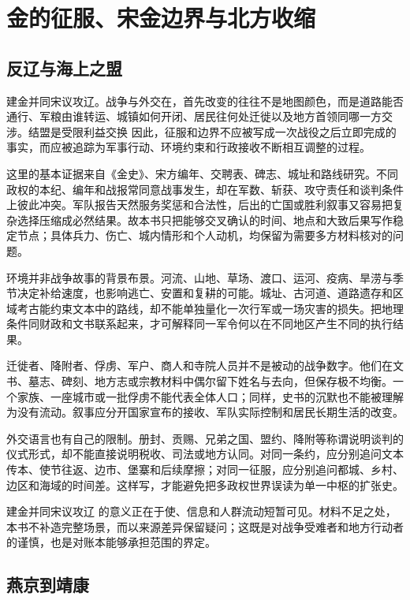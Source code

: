 \section{金的征服、宋金边界与北方收缩}

\subsection{反辽与海上之盟}

建金并同宋议攻辽。战争与外交在，首先改变的往往不是地图颜色，而是道路能否通行、军粮由谁转运、城镇如何开闭、居民往何处迁徙以及地方首领同哪一方交涉。结盟是受限利益交换 因此，征服和边界不应被写成一次战役之后立即完成的事实，而应被追踪为军事行动、环境约束和行政接收不断相互调整的过程。

这里的基本证据来自《金史》、宋方编年、交聘表、碑志、城址和路线研究。不同政权的本纪、编年和战报常同意战事发生，却在军数、斩获、攻守责任和谈判条件上彼此冲突。军队报告天然服务奖惩和合法性，后出的亡国或胜利叙事又容易把复杂选择压缩成必然结果。故本书只把能够交叉确认的时间、地点和大致后果写作稳定节点；具体兵力、伤亡、城内情形和个人动机，均保留为需要多方材料核对的问题。

环境并非战争故事的背景布景。河流、山地、草场、渡口、运河、疫病、旱涝与季节决定补给速度，也影响逃亡、安置和复耕的可能。城址、古河道、道路遗存和区域考古能约束文本中的路线，却不能单独量化一次行军或一场灾害的损失。把地理条件同财政和文书联系起来，才可解释同一军令何以在不同地区产生不同的执行结果。

迁徙者、降附者、俘虏、军户、商人和寺院人员并不是被动的战争数字。他们在文书、墓志、碑刻、地方志或宗教材料中偶尔留下姓名与去向，但保存极不均衡。一个家族、一座城市或一批俘虏不能代表全体人口；同样，史书的沉默也不能被理解为没有流动。叙事应分开国家宣布的接收、军队实际控制和居民长期生活的改变。

外交语言也有自己的限制。册封、贡赐、兄弟之国、盟约、降附等称谓说明谈判的仪式形式，却不能直接说明税收、司法或地方认同。对同一条约，应分别追问文本传本、使节往返、边市、堡寨和后续摩擦；对同一征服，应分别追问都城、乡村、边区和海域的时间差。这样写，才能避免把多政权世界误读为单一中枢的扩张史。

建金并同宋议攻辽 的意义正在于使、信息和人群流动短暂可见。材料不足之处，本书不补造完整场景，而以来源差异保留疑问；这既是对战争受难者和地方行动者的谨慎，也是对账本能够承担范围的界定。

\subsection{燕京到靖康}

